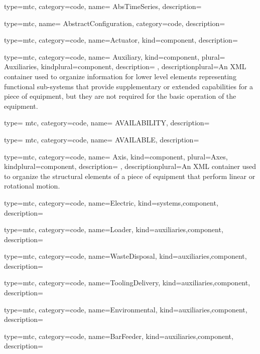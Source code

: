 

{
  type=mtc,
  category=code,
  name= {AbsTimeSeries},
  description= {}
}


{
  type=mtc,
  name= {AbstractConfiguration},
  category=code,
  description= {}
}

{
  type=mtc,
  category=code,
  name={Actuator},
  kind={component},
  description={}
}


{
  type=mtc,
  category=code,
  name= {Auxiliary},
  kind={component},
  plural= {Auxiliaries},
  kindplural={component},
  description= {},
  descriptionplural={An XML container used to organize information for \gls{lower level} elements representing functional sub-systems that provide supplementary or extended capabilities for a piece of equipment, but they are not required for the basic operation of the equipment.}
}


{
  type= mtc,
  category=code,
  name= {AVAILABILITY},
  description= {}
}


{
  type= mtc,
  category=code,
  name= {AVAILABLE},
  description= {}
}


{
  type=mtc,
  category=code,
  name= {Axis},
  kind={component},
  plural={Axes},
  kindplural={component},
  description= {},
  descriptionplural={An XML container used to organize the \glspl{structural element} of a piece of equipment that perform linear or rotational motion.}
}


{
  type=mtc,
  category=code,
  name={Electric},
  kind={systems,component},
  description={}
}


{
  type=mtc,
  category=code,
  name={Loader},
  kind={auxiliaries,component},
  description={}
}


{
  type=mtc,
  category=code,
  name={WasteDisposal},
  kind={auxiliaries,component},
  description={}
}


{
  type=mtc,
  category=code,
  name={ToolingDelivery},
  kind={auxiliaries,component},
  description={}
}


{
  type=mtc,
  category=code,
  name={Environmental},
  kind={auxiliaries,component},
  description={}
}


{
  type=mtc,
  category=code,
  name={BarFeeder},
  kind={auxiliaries,component},
  description={}
}


